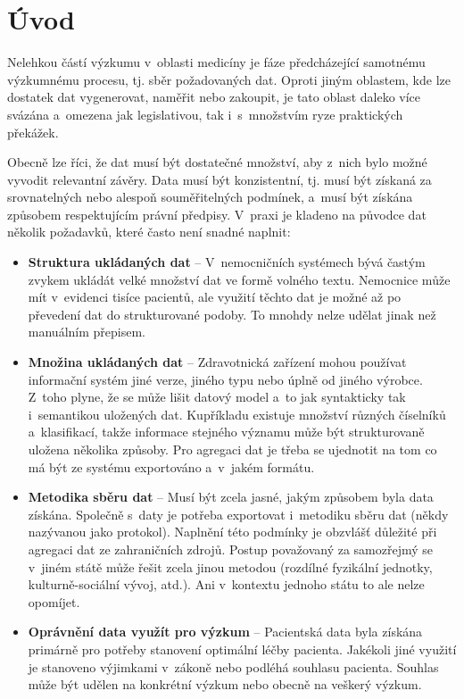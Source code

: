 \documentclass[11pt, final, oneside]{fithesis2}
\newcommand{\polozka}[1]{\item {\bf #1}\xspace}
\begin{document}
\MainMatter

\tableofcontents

\chapter{Úvod}

Nelehkou částí výzkumu v~oblasti medicíny je fáze předcházející samotnému výzkumnému procesu, tj. sběr požadovaných dat. Oproti jiným oblastem, kde lze dostatek dat vygenerovat, naměřit nebo zakoupit, je tato oblast daleko více svázána a~omezena jak legislativou, tak i~s~množstvím ryze praktických překážek.

Obecně lze říci, že dat musí být dostatečné množství, aby z~nich bylo možné vyvodit relevantní závěry. Data musí být konzistentní, tj. musí být získaná za srovnatelných nebo alespoň souměřitelných podmínek, a~musí být získána způsobem respektujícím právní předpisy. V~praxi je kladeno na původce dat několik požadavků, které často není snadné naplnit:

\begin{itemize}
\polozka{Struktura ukládaných dat} -- V~nemocničních systémech bývá častým zvykem ukládát velké množství dat ve formě volného textu. Nemocnice může mít v~evidenci tisíce pacientů, ale využití těchto dat je možné až po převedení dat do strukturované podoby. To mnohdy nelze udělat jinak než manuálním přepisem.
	
	\polozka{Množina ukládaných dat} -- Zdravotnická zařízení mohou používat informační systém jiné verze, jiného typu nebo úplně od jiného výrobce. Z~toho plyne, že se může lišit datový model a~to jak syntakticky tak i~semantikou uložených dat. Kupříkladu existuje množství různých číselníků a~klasifikací, takže informace stejného významu může být strukturovaně uložena několika způsoby. Pro agregaci dat je třeba se ujednotit na tom co má být ze systému exportováno a~v~jakém formátu. 
		
	\polozka{Metodika sběru dat} -- Musí být zcela jasné, jakým způsobem byla data získána. Společně s~daty je potřeba exportovat i~metodiku sběru dat (někdy nazývanou jako protokol). Naplnění této podmínky je obzvlášť důležité při agregaci dat ze zahraničních zdrojů. Postup považovaný za samozřejmý se v~jiném státě může řešit zcela jinou metodou (rozdílné fyzikální jednotky, kulturně-sociální vývoj, atd.). Ani v~kontextu jednoho státu to ale nelze opomíjet. 
	
	\polozka{Oprávnění data využít pro výzkum} -- Pacientská data byla získána primárně pro potřeby stanovení optimální léčby pacienta. Jakékoli jiné využití je stanoveno výjimkami v~zákoně nebo podléhá souhlasu pacienta. Souhlas může být udělen na konkrétní výzkum nebo obecně na veškerý výzkum.
\end{itemize}
\end{document}
